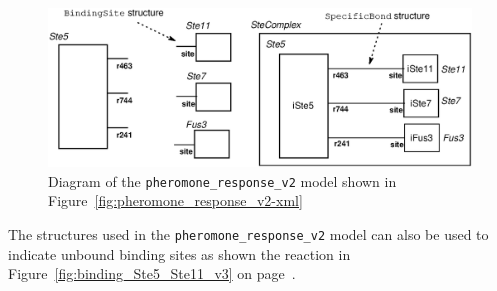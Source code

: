 \documentclass{cekarticle}
\begin{document}
\begin{figure}[h]
  \vspace*{8pt}
  \centering
  \includegraphics[scale = 0.7]{pheromone_response_v2.eps}
  \caption{Diagram of the \texttt{pheromone\_response\_v2} model shown in
  Figure~\ref{fig:pheromone_response_v2-xml}}
  \label{fig:pheromone_response_v2}
\end{figure}

The  structures used in the \texttt{pheromone\_response\_v2} model can also be
used to indicate unbound binding sites as shown the reaction in Figure~\ref{fig:binding_Ste5_Ste11_v3} on
page~\pageref{fig:binding_Ste5_Ste11_v3}.
\end{document}
